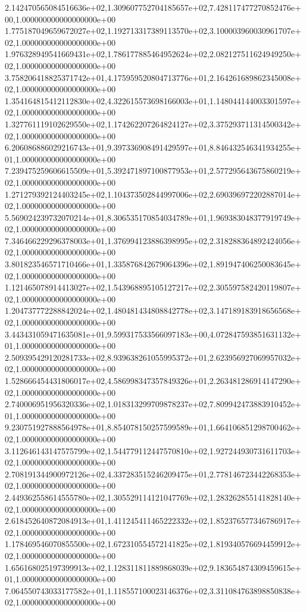 2.142470565084516636e+02,1.309607752704185657e+02,7.428117477270852476e+00,1.000000000000000000e+00
1.775187049659672027e+02,1.192713317389113570e+02,3.100003960030961707e+02,1.000000000000000000e+00
1.976328949541669431e+02,1.786177885464952624e+02,2.082127511624949250e+02,1.000000000000000000e+00
3.758206418825371742e+01,4.175959520804713776e+01,2.164261689862345008e+02,1.000000000000000000e+00
1.354164815412112830e+02,4.322615573698166003e+01,1.148044144003301597e+02,1.000000000000000000e+00
1.327761119102629550e+02,1.174262207264824127e+02,3.375293711314500342e+02,1.000000000000000000e+00
6.206086886029216743e+01,9.397336908491429597e+01,8.846432546341934255e+01,1.000000000000000000e+00
7.239475259606615509e+01,5.392471897100877953e+01,2.577295643675860219e+02,1.000000000000000000e+00
1.271279392124403245e+02,1.104373502844997006e+02,2.690396972202887014e+02,1.000000000000000000e+00
5.569024239732070214e+01,8.306535170854034789e+01,1.969383048377919749e+02,1.000000000000000000e+00
7.346466229296378003e+01,1.376994123886398995e+02,2.318288364892424056e+02,1.000000000000000000e+00
3.801823546571710466e+01,1.335876842679064396e+02,1.891947406250083645e+02,1.000000000000000000e+00
1.121465078914413027e+02,1.543968895105127217e+02,2.305597582420119807e+02,1.000000000000000000e+00
1.204737772288842024e+02,1.480481434808842778e+02,3.147189183918656568e+02,1.000000000000000000e+00
3.443431059471635081e+01,9.599317533566097183e+00,4.072847593851631132e+01,1.000000000000000000e+00
2.509395429120281733e+02,8.939638261055995372e+01,2.623956927069957032e+02,1.000000000000000000e+00
1.528666454431806017e+02,4.586998347357849326e+01,2.263481286914147290e+02,1.000000000000000000e+00
2.740006951956320336e+02,1.018313299709878237e+02,7.809942473883910452e+01,1.000000000000000000e+00
9.230751927888564978e+01,8.854078150257599589e+01,1.664106851298700462e+02,1.000000000000000000e+00
3.112646143147575799e+02,1.544779112447570810e+02,1.927244930731611703e+02,1.000000000000000000e+00
2.708191344900972126e+02,4.337283515246209475e+01,2.778146723442268353e+02,1.000000000000000000e+00
2.449362558614555780e+02,1.305529114121047769e+02,1.283262855141828140e+02,1.000000000000000000e+00
2.618452640872084913e+01,1.411245411465222332e+02,1.852376577346786917e+02,1.000000000000000000e+00
1.178469546070855500e+02,1.672310554572141825e+02,1.819340576694459912e+02,1.000000000000000000e+00
1.656168025197399913e+02,1.128311811889868039e+02,9.183654874309459615e+01,1.000000000000000000e+00
7.064550743033177582e+01,1.118557100023146376e+02,3.311084763898850838e+02,1.000000000000000000e+00
